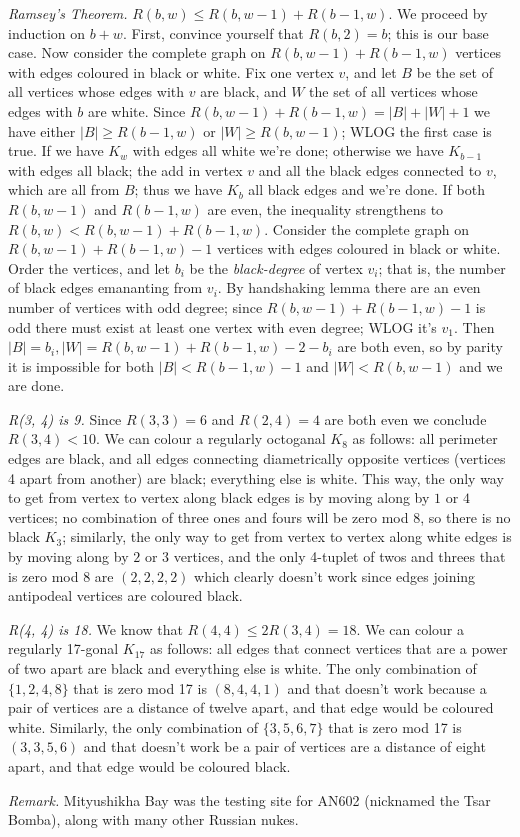\begin{solution}
    \textit{Ramsey's Theorem.} $R(b, w) \leq R(b, w - 1) + R(b - 1, w).$ We proceed by induction on $b + w$. First, convince yourself that $R(b, 2) = b$; 
    this is our base case. Now consider the complete graph on $R(b, w - 1) + R(b - 1, w)$ vertices with edges coloured in black or white. Fix one vertex $v$, and let $B$ be the set of all vertices whose
    edges with $v$ are black, and $W$ the set of all vertices whose edges with $b$ are white. Since $R(b, w - 1) + R(b - 1, w) = |B| + |W| + 1$ we have either
    $|B| \geq R(b - 1, w)$ or $|W| \geq R(b, w - 1)$; WLOG the first case is true. If we have $K_w$ with edges all white we're done; otherwise we have $K_{b - 1}$
    with edges all black; the add in vertex $v$ and all the black edges connected to $v$, which are all from $B$; thus we have $K_b$ all black edges and we're done. 
    If both $R(b, w - 1)$ and $R(b - 1, w)$ are even, the inequality strengthens to $R(b, w) < R(b, w - 1) + R(b - 1, w)$. Consider the complete graph on
    $R(b, w - 1) + R(b - 1, w) - 1$ vertices with edges coloured in black or white. Order the vertices, and let $b_i$ be the \textit{black-degree} of vertex $v_i$; 
    that is, the number of black edges emananting from $v_i$. By handshaking lemma there are an even number of vertices with odd degree; since $R(b, w - 1) + R(b - 1, w) - 1$
    is odd there must exist at least one vertex with even degree; WLOG it's $v_1$. Then $|B| = b_i, |W| = R(b, w - 1) + R(b - 1, w) - 2 - b_i$ are both even, so
    by parity it is impossible for both $|B| < R(b - 1, w) - 1$ and $|W| < R(b, w - 1)$ and we are done.

    \textit{R(3, 4) is 9.} Since $R(3, 3) = 6$ and $R(2, 4) = 4$ are both even we conclude $R(3, 4) < 10$. We can colour a regularly octoganal $K_8$ as follows:
    all perimeter edges are black, and all edges connecting diametrically opposite vertices (vertices 4 apart from another) are black; everything else is white.
    This way, the only way to get from vertex to vertex along black edges is by moving along by $1$ or $4$ vertices; no combination of three ones and fours will be 
    zero mod 8, so there is no black $K_3$; similarly, the only way to get from vertex to vertex along white edges is by moving along by $2$ or $3$ vertices, and the 
    only 4-tuplet of twos and threes that is zero mod 8 are $(2, 2, 2, 2)$ which clearly doesn't work since edges joining antipodeal vertices are coloured black. \medskip

    \textit{R(4, 4) is 18.} We know that $R(4, 4) \leq 2R(3, 4) = 18$. We can colour a regularly 17-gonal $K_{17}$ as follows:
    all edges that connect vertices that are a power of two apart are black and everything else is white. The only combination of $\{1, 2, 4, 8\}$ that is zero mod 17
    is $(8, 4, 4, 1)$ and that doesn't work because a pair of vertices are a distance of twelve apart, and that edge would be coloured white.
    Similarly, the only combination of $\{3, 5, 6, 7\}$ that is zero mod 17 is $(3, 3, 5, 6)$ and that doesn't work be a pair of vertices are a distance 
    of eight apart, and that edge would be coloured black. \medskip

    \textit{Remark.} Mityushikha Bay was the testing site for AN602 (nicknamed the Tsar Bomba), along with many other Russian nukes. 
\end{solution}\bigskip
